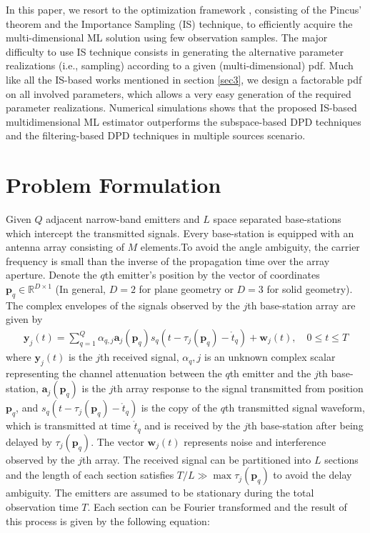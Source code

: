 \documentclass[review]{elsarticle}
\begin{document}
In this paper, we resort to the optimization framework \cite{Kay2000Mean}, consisting of the Pincus' theorem \cite{Pincus1968A} and the Importance Sampling (IS) technique, to efficiently acquire the multi-dimensional ML solution using few observation samples. The major difficulty to use IS technique consists in generating the alternative parameter realizations (i.e., sampling) according to a given (multi-dimensional) pdf. Much like all the IS-based works mentioned in section \ref{sec3}, we design a factorable pdf on all involved parameters, which allows a very easy generation of the required parameter realizations. Numerical simulations shows that the proposed IS-based multidimensional ML estimator outperforms the subspace-based DPD techniques and the filtering-based DPD techniques in multiple sources scenario.

\section{Problem Formulation}
Given $Q$ adjacent narrow-band emitters and $L$ space separated base-stations which intercept the transmitted signals. Every base-station is equipped with an antenna array consisting of $M$ elements.To avoid the angle ambiguity, the carrier frequency is small than the inverse of the propagation time over the array aperture. Denote the $q$th emitter’s position by the vector of coordinates $\boldsymbol{p}_q\in \mathbb{R}^{D\times 1}$ (In general, $D=2$ for plane geometry or $D=3$ for solid geometry). The complex envelopes of the signals observed by the $j$th base-station array are given by
\begin{align}\label{yjt}
\boldsymbol{y}_j(t)=\sum_{q=1}^Q\alpha_{q,j}\boldsymbol{a}_j(\boldsymbol{p}_q)s_q(t-\tau_j(\boldsymbol{p}_q)-\mathring{t}_q)+\boldsymbol{w}_{j}(t),\quad 0\leq t\leq T
\end{align}
where $\boldsymbol{y}_j(t)$ is the $j$th received signal, $\alpha_q,j$ is an unknown complex scalar representing the channel attenuation between the $q$th emitter and the $j$th base-station, $\boldsymbol{a}_j(\boldsymbol{p}_q)$ is the $j$th array response to the signal transmitted from position $\boldsymbol{p}_q$, and $s_q(t-\tau_j(\boldsymbol{p}_q)-\mathring{t}_q)$ is the copy of the $q$th transmitted signal waveform, which is transmitted at time $\mathring{t}_q$ and is received by the $j$th base-station after being delayed by $\tau_j(\boldsymbol{p}_q)$. The vector $\boldsymbol{w}_j(t)$ represents noise and interference observed by the $j$th array. The received signal can be partitioned into $L$ sections and the length of each section satisfies $T/L\gg \max{\tau_j(\boldsymbol{p}_q)}$ to avoid the delay ambiguity. The emitters are assumed to be stationary during the total observation time $T$. Each section can be Fourier transformed and the result of this process is given by the following equation:
\end{document}
